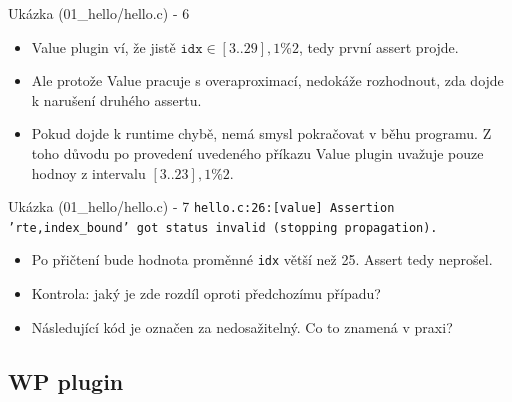 \documentclass[11pt]{beamer}
\begin{document}

\begin{frame}{Ukázka (01\_hello/hello.c) - 6}
	\lstFirstValueMainPartFour

	\begin{itemize}
			\item Value plugin ví, že jistě \( \texttt{idx} \in [3..29],1 \%2 \),
				tedy první assert projde.
			\item Ale protože Value pracuje s overaproximací, nedokáže rozhodnout,
				zda dojde k narušení druhého assertu.
			\item Pokud dojde k runtime chybě, nemá smysl pokračovat v běhu programu.
				Z toho důvodu po provedení uvedeného příkazu Value plugin uvažuje
				pouze hodnoy z intervalu \( [3..23],1\%2 \).
	\end{itemize}
\end{frame}


\begin{frame}{Ukázka (01\_hello/hello.c) - 7}
	\lstFirstValueMainPartFive
	\texttt{hello.c:26:[value] Assertion 'rte,index\_bound' got status invalid
	(stopping propagation).}
	\begin{itemize}
		\item Po přičtení bude hodnota proměnné \texttt{idx} větší než 25.
			Assert tedy neprošel.
		\pause \item Kontrola: jaký je zde rozdíl oproti předchozímu případu?
		\pause \item Následující kód je označen za nedosažitelný. Co to znamená v praxi?
	\end{itemize}
\end{frame}

\subsection{WP plugin}
\end{document}
